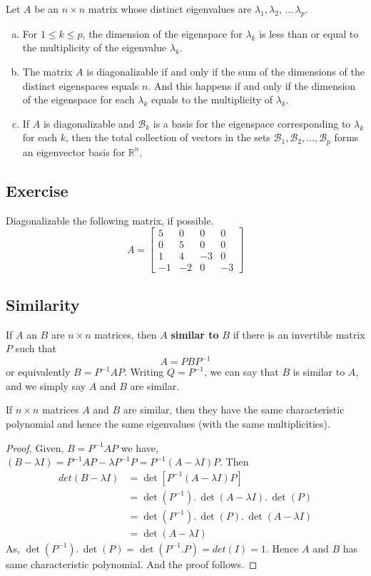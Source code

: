\documentclass[aima104_lecturenotes_ku.tex]{subfiles}
\begin{document}
\begin{theorem}
  Let $A$ be an $n \times n$ matrix whose distinct eigenvalues are $\lambda_1, \lambda_2,\, ...\, \lambda_p$.
  \begin{enumerate}[a. ]
  \item For $1 \leq k \leq p$, the dimension of the eigenspace for $\lambda_k$ is less than or equal to the multiplicity of the eigenvalue $\lambda_k$.
  \item The matrix $A$ is diagonalizable if and only if the sum of the dimensions of the distinct eigenspaces equals $n$. And this happens if and only if the dimension of the eigenspace for each $\lambda_k$ equals to the multiplicity of $\lambda_k$.
   \item If $A$ is diagonalizable and $\mathcal{B}_k$ is a basis for the eigenspace corresponding to $\lambda_k$ for each $k$, then the total collection of vectors in the sets $\mathcal{B}_1, \mathcal{B}_2, ..., \mathcal{B}_p$ forms an eigenvector basis for $\mathbb{R}^n$.
  \end{enumerate}
\end{theorem}

\subsection{Exercise}
Diagonalizable the following matrix, if possible.
$$A=
\begin{bmatrix}
  5 & 0 & 0 & 0 \\
  0 & 5 & 0 & 0 \\
  1 & 4 & -3 & 0 \\
  -1 & -2 & 0 & -3
\end{bmatrix}
$$

\subsection{Similarity}
If $A$ an $B$ are $n \times n$ matrices, then $A$ \textbf{similar to} $B$ if there is an invertible matrix $P$ such that $$A = PBP^{-1}$$ or equivalently $B=P^{-1}AP$. Writing $Q=P^{-1}$, we can say that $B$ is similar to $A$, and we simply say $A$ and $B$ are similar.
\begin{theorem}
  If $n \times n$ matrices $A$ and $B$ are similar, then they have the same characteristic polynomial and hence the same eigenvalues (with the same multiplicities).
\end{theorem}
\begin{proof}
 \hspace{1cm} Given, $B=P^{-1}AP$ we have, $(B-\lambda I) = P^{-1}AP - \lambda P^{-1}P = P^{-1}(A- \lambda I) P$. Then
    \begin{align*}
      det(B-\lambda I) &= \det[P^{-1}(A- \lambda I) P] \\
                       &= \det(P^{-1}).\, \det(A- \lambda I).\, \det(P) \\
                       &= \det(P^{-1}).\, \det(P). \, \det(A- \lambda I) \\
                       &= \det(A- \lambda I)
    \end{align*}
  As, $\det(P^{-1}).\, \det(P) = \det(P^{-1}.P)=det(I) = 1$. Hence $A$ and $B$ has same characteristic polynomial. And the proof follows.
\end{proof}
\end{document}
